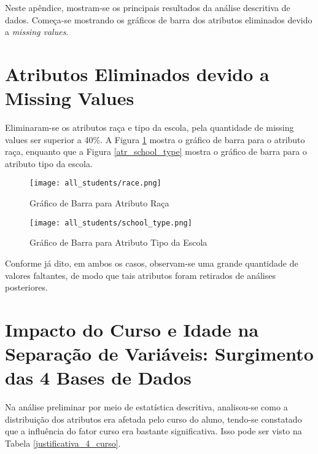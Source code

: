 Neste apêndice, mostram-se os principais resultados da análise descritiva de dados. 
Começa-se mostrando os gráficos de barra dos atributos eliminados devido a
\textit{missing values}. 

\section{Atributos Eliminados devido a Missing Values} \label{graf_miss_value}
\par Eliminaram-se os atributos raça e tipo da escola, pela quantidade de missing
values ser superior a 40\%.  A Figura \ref{atr_race} mostra o gráfico de barra para o
atributo raça, enquanto que a Figura \ref{atr_school_type} mostra o gráfico de barra
para o atributo tipo da escola.  
    \begin{figure}[!ht]
        \caption{Gráfico de Barra para Atributo Raça}
        \centering
        \texttt{[image: all\_students/race.png]}
        \label{atr_race}
    \end{figure}

    \begin{figure}[!ht]
        \caption{Gráfico de Barra para Atributo Tipo da Escola}
        \centering
        \texttt{[image: all\_students/school\_type.png]}
        \label{atr_school}
    \end{figure}

Conforme já dito, em ambos os casos, observam-se uma grande quantidade de valores
faltantes, de modo que tais atributos foram retirados de análises posteriores. 

\section{Impacto do Curso e Idade na Separação de Variáveis: Surgimento das 4 Bases
de Dados} \label{justificativa_4_base_dados}
Na análise preliminar por meio de estatística descritiva, analisou-se como a
distribuição dos atributos era afetada pelo curso do aluno, tendo-se constatado que a
influência do fator curso era bastante significativa. Isso pode ser visto na Tabela
\ref{justificativa_4_curso}.

